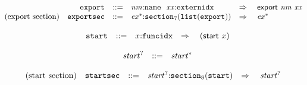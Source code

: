 \vspace{1ex}

$$
\begin{array}[t]{@{}lrrl@{}l@{}l@{}l@{}}
& {\mathtt{export}} & ::= & {\mathit{nm}}{:}{\mathtt{name}}~~{\mathit{xx}}{:}{\mathtt{externidx}} & \quad\Rightarrow\quad{} & \mathsf{export}~{\mathit{nm}}~{\mathit{xx}} \\
\mbox{(export section)} & {\mathtt{exportsec}} & ::= & {{\mathit{ex}}^\ast}{:}{{\mathtt{section}}}_{7}({\mathtt{list}}({\mathtt{export}})) & \quad\Rightarrow\quad{} & {{\mathit{ex}}^\ast} \\
\end{array}
$$

\vspace{1ex}

$$
\begin{array}[t]{@{}lrrl@{}l@{}l@{}l@{}}
& {\mathtt{start}} & ::= & x{:}{\mathtt{funcidx}} & \quad\Rightarrow\quad{} & (\mathsf{start}~x) \\
\end{array}
$$

$$
\begin{array}[t]{@{}lrrl@{}l@{}}
& {{\mathit{start}}^?} & ::= & {{\mathit{start}}^\ast} \\
\end{array}
$$

$$
\begin{array}[t]{@{}lrrl@{}l@{}l@{}l@{}}
\mbox{(start section)} & {\mathtt{startsec}} & ::= & {{\mathit{start}}^?}{:}{{\mathtt{section}}}_{8}({\mathtt{start}}) & \quad\Rightarrow\quad{} & {{\mathit{start}}^?} \\
\end{array}
$$

\vspace{1ex}

